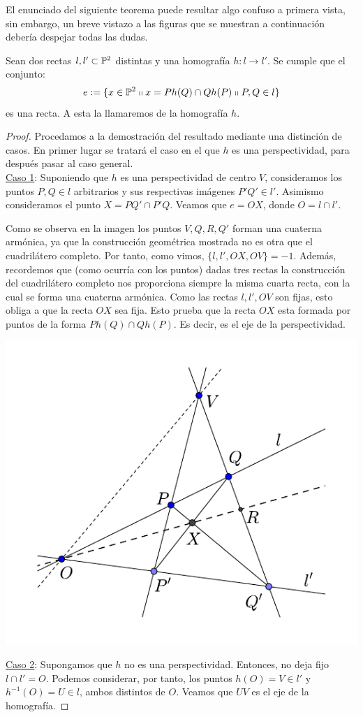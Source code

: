 El enunciado del siguiente teorema puede resultar algo confuso a primera vista, sin embargo, un breve vistazo a las figuras que se muestran a continuación debería despejar todas las dudas.
\begin{theo}
	\label{C7_teo_eje}
	Sean dos rectas $l,l'\subset\mathbb{P}^2$ distintas y una homografía $h:l\to l'$. Se cumple que el conjunto:
	\[e:=\{x\in\mathbb{P}^2\shortparallel x=Ph(Q)\cap Qh(P)\shortparallel P,Q\in l\}\]
	es una recta. A esta la llamaremos  de la homografía $h$. 
\end{theo}
\begin{proof}
	Procedamos a la demostración del resultado mediante una distinción de casos. En primer lugar se tratará el caso en el que $h$ es una perspectividad, para después pasar al caso general.\\
	
	\underline{Caso 1}: Suponiendo que $h$ es una perspectividad de centro $V$, consideramos los puntos $P,Q\in l$ arbitrarios y sus respectivas imágenes $P'Q'\in l'$. Asimismo consideramos el punto $X=PQ'\cap P'Q$. Veamos que $e=OX$, donde $O=l\cap l'$.
	
	Como se observa en la imagen los puntos $V,Q,R,Q'$ forman una cuaterna armónica, ya que la construcción geométrica mostrada no es otra que el cuadrilátero completo. Por tanto, como vimos, $\{l,l',OX,OV\}=-1$. Además, recordemos que (como ocurría con los puntos) dadas tres rectas la construcción del cuadrilátero completo nos proporciona siempre la misma cuarta recta, con la cual se forma una cuaterna armónica. Como las rectas $l,l',OV$ son fijas, esto obliga a que la recta $OX$ sea fija. Esto prueba que la recta $OX$ esta formada por puntos de la forma $Ph(Q)\cap Qh(P)$. Es decir, es el eje de la perspectividad.
	\begin{center}
		\includegraphics[scale=.9]{Graficos/TeoremaDelEje/TeoremaDelEjeCaso1}
	\end{center}
	\underline{Caso 2}: Supongamos que $h$ no es una perspectividad. Entonces, no deja fijo $l\cap l'=O$. Podemos considerar, por tanto, los puntos $h(O)=V\in l'$ y $
	h^{-1}(O)=U\in l$, ambos distintos de $O$. Veamos que $UV$ es el eje de la homografía. 
	

\end{proof}
